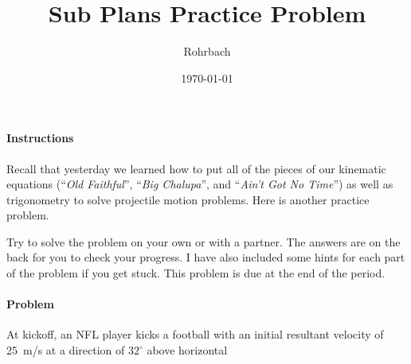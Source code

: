 \documentclass[10pt]{exam}
\title{Sub Plans Practice Problem}
\author{Rohrbach}
\date{\today}
\begin{document}
\maketitle


\paragraph{Instructions}
Recall that yesterday we learned how to put all of the pieces of our kinematic equations (``\emph{Old Faithful}'', ``\emph{Big Chalupa}'', and ``\emph{Ain't Got No Time}'') as well as trigonometry to solve projectile motion problems.  Here is another practice problem. 

Try to solve the problem on your own or with a partner.  The answers are on the back for you to check your progress.  I have also included some hints for each part of the problem if you get stuck.  This problem is due at the end of the period.


\paragraph{Problem}
At kickoff, an NFL player kicks a football with an initial resultant velocity of 25~m/s at a direction of $32^\circ$ above horizontal

\hfill
\end{document}
